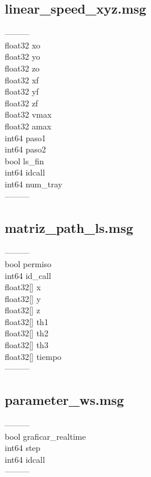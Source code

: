         \subsection{linear\_speed\_xyz.msg}
        ---------\\
            float32 xo \\
            float32 yo\\
            float32 zo\\
            float32 xf\\
            float32 yf\\
            float32 zf\\
            float32 vmax\\
            float32 amax\\
            int64 paso1\\
            int64 paso2\\
            bool ls\_fin\\
            int64 idcall\\
            int64 num\_tray\\
        ---------\\

        \subsection{matriz\_path\_ls.msg}
        ---------\\
            bool permiso\\
            int64 id\_call\\
            float32[] x\\
            float32[] y\\
            float32[] z\\
            float32[] th1\\
            float32[] th2\\
            float32[] th3\\
            float32[] tiempo\\
        ---------\\

        \subsection{parameter\_ws.msg}
        ---------\\
            bool graficar\_realtime\\
            int64 step\\
            int64 idcall\\
                    ---------\\


